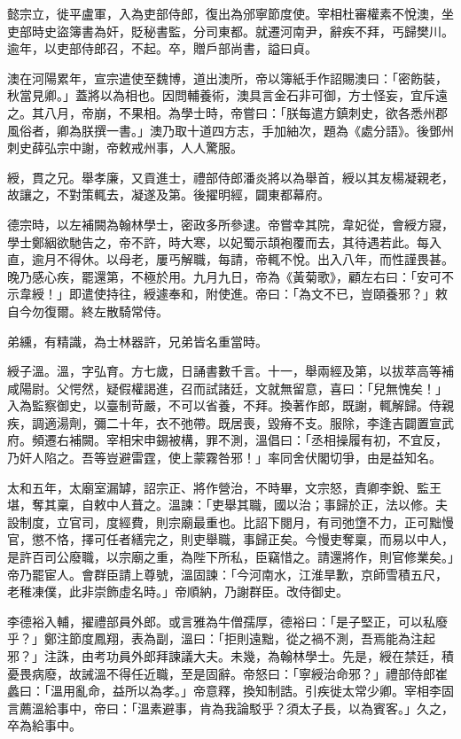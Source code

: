 \begin{pinyinscope}
 懿宗立，徙平盧軍，入為吏部侍郎，復出為邠寧節度使。宰相杜審權素不悅澳，坐吏部時史盜簿書為奸，貶秘書監，分司東都。就遷河南尹，辭疾不拜，丐歸樊川。逾年，以吏部侍郎召，不起。卒，贈戶部尚書，謚曰貞。



 澳在河陽累年，宣宗遣使至魏博，道出澳所，帝以簿紙手作詔賜澳曰：「密飭裝，秋當見卿。」蓋將以為相也。因問輔養術，澳具言金石非可御，方士怪妄，宜斥遠之。其八月，帝崩，不果相。為學士時，帝嘗曰：「朕每遣方鎮刺史，欲各悉州郡風俗者，卿為朕撰一書。」澳乃取十道四方志，手加紬次，題為《處分語》。後鄧州刺史薛弘宗中謝，帝敕戒州事，人人驚服。



 綬，貫之兄。舉孝廉，又貢進士，禮部侍郎潘炎將以為舉首，綬以其友楊凝親老，故讓之，不對策輒去，凝遂及第。後擢明經，闢東都幕府。



 德宗時，以左補闕為翰林學士，密政多所參逮。帝嘗幸其院，韋妃從，會綬方寢，學士鄭絪欲馳告之，帝不許，時大寒，以妃蜀示頡袍覆而去，其待遇若此。每入直，逾月不得休。以母老，屢丐解職，每請，帝輒不悅。出入八年，而性謹畏甚。晚乃感心疾，罷還第，不極於用。九月九日，帝為《黃菊歌》，顧左右曰：「安可不示韋綬！」即遣使持往，綬遽奉和，附使進。帝曰：「為文不已，豈頤養邪？」敕自今勿復爾。終左散騎常侍。



 弟纁，有精識，為士林器許，兄弟皆名重當時。



 綬子溫。溫，字弘育。方七歲，日誦書數千言。十一，舉兩經及第，以拔萃高等補咸陽尉。父愕然，疑假權謁進，召而試諸廷，文就無留意，喜曰：「兒無愧矣！」入為監察御史，以臺制苛嚴，不可以省養，不拜。換著作郎，既謝，輒解歸。侍親疾，調適湯劑，彌二十年，衣不弛帶。既居喪，毀瘠不支。服除，李逢吉闢置宣武府。頻遷右補闕。宰相宋申錫被構，罪不測，溫倡曰：「丞相操履有初，不宜反，乃奸人陷之。吾等豈避雷霆，使上蒙霧咎邪！」率同舍伏閣切爭，由是益知名。



 太和五年，太廟室漏罅，詔宗正、將作營治，不時畢，文宗怒，責卿李銳、監王堪，奪其稟，自敕中人葺之。溫諫：「吏舉其職，國以治；事歸於正，法以修。夫設制度，立官司，度經費，則宗廟最重也。比詔下閱月，有司弛墯不力，正可黜慢官，懲不恪，擇可任者繕完之，則吏舉職，事歸正矣。今慢吏奪稟，而易以中人，是許百司公廢職，以宗廟之重，為陛下所私，臣竊惜之。請還將作，則官修業矣。」帝乃罷宦人。會群臣請上尊號，溫固諫：「今河南水，江淮旱歉，京師雪積五尺，老稚凍僕，此非崇飾虛名時。」帝順納，乃謝群臣。改侍御史。



 李德裕入輔，擢禮部員外郎。或言雅為牛僧孺厚，德裕曰：「是子堅正，可以私廢乎？」鄭注節度鳳翔，表為副，溫曰：「拒則遠黜，從之禍不測，吾焉能為注起邪？」注誅，由考功員外郎拜諫議大夫。未幾，為翰林學士。先是，綬在禁廷，積憂畏病廢，故誡溫不得任近職，至是固辭。帝怒曰：「寧綬治命邪？」禮部侍郎崔蠡曰：「溫用亂命，益所以為孝。」帝意釋，換知制誥。引疾徙太常少卿。宰相李固言薦溫給事中，帝曰：「溫素避事，肯為我論駁乎？須太子長，以為賓客。」久之，卒為給事中。




\end{pinyinscope}
